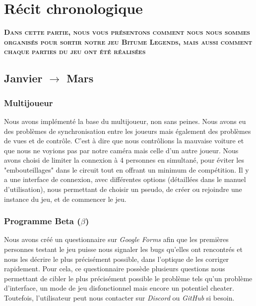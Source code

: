 \documentclass[a4paper,12pt]{article}
\begin{document}
    \section{Récit chronologique}
    \textbf{\textsc{Dans cette partie, nous vous présentons comment nous nous sommes organisés pour sortir notre jeu Bitume Legends, mais aussi comment chaque parties du jeu ont été réalisées}}
        \subsection{Janvier $\to$ Mars}
            \subsubsection{Multijoueur}
                Nous avons implémenté la base du multijoueur, non sans peines. Nous avons eu des problèmes de 
                synchronisation entre les joueurs mais également des problèmes de vues et de contrôle. C'est à dire 
                que nous contrôlions la mauvaise voiture et que nous ne voyions pas par notre caméra mais celle d'un 
                autre joueur. 
                Nous avons choisi de limiter la connexion à 4 personnes en simultané, pour éviter les 
                "embouteillages" dans le circuit tout en offrant un minimum de compétition. Il y a une interface de 
                connexion, avec différentes options (détaillées dans le manuel d'utilisation), nous permettant de 
                choisir un pseudo, de créer ou rejoindre une instance du jeu, et de commencer le jeu.
  
            \subsubsection{Programme Beta (\(\beta\))}
                Nous avons créé un questionnaire sur \textsl{Google Forms} afin que les premières personnes testant
                le jeu puisse nous signaler les bugs qu'elles ont rencontrés et nous les décrire le plus 
                précisément possible, dans l'optique de les corriger rapidement. Pour cela, ce questionnaire 
                possède plusieurs questions nous permettant de cibler le plus précisément possible le problème tels qu'un problème d'interface, un mode de jeu disfonctionnel mais encore un 
                potentiel cheater. 
                Toutefois, l'utilisateur peut nous contacter sur \textsl{Discord} ou \textsl{GitHub} si besoin.
        
\end{document}
